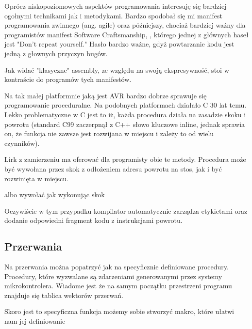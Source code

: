 \documentclass[11pt]{article}
\begin{document}
Oprócz niskopoziomowych aspektów programowania interesuję się bardziej ogołnymi technikami jak i metodykami. Bardzo spodobał się mi manifest programowania zwinnego (ang. agile) oraz późniejszy, chociaż bardziej ważny dla programistów manifest Software Craftsmanship, , którego jednej z głównych haseł jest "Don't repeat yourself." Hasło bardzo ważne, gdyż powtarzanie kodu jest jedną z głownych przyczyn bugów. 

Jak widać "klasyczne" assembly, ze względu na swoją ekspresywność, stoi w kontraście do programów tych manifestów. 

Na tak małej platformnie jaką jest AVR bardzo dobrze sprawuje się programowanie proceduralne. Na podobnych platformach działało C 30 lat temu. Lekko problematyczne w C jest to iż, każda procedura działa na zasadzie skoku i powrotu (standard C99 zaczerpnął z C++ słowo kluczowe inline, jednak sprawia on, że funkcja nie zawsze jest rozwijana w miejscu i zależy to od wielu czynników). 

Lirk z zamierzeniu ma oferować dla programisty obie te metody. Procedura może być wywołana przez skok z odłożeniem adresu powrotu na stos, jak i być rozwinięta w miejscu.
\newpage

\begin{multicols}{2}

\columnbreak

\end{multicols}
albo wywołać jak wykonując skok
\begin{multicols}{2}

\columnbreak

\end{multicols}

Oczywiście w tym przypadku kompilator automatycznie zarządza etykietami oraz dodanie odpowiedni fragment kodu z instrukcjami powrotu.

\subsection{Przerwania}

Na przerwania można popatrzyć jak na specyficznie definiowane procedury. Procedury, które wyzwalane są zdarzeniami generowanymi przez systemy mikrokontrolera.
Wiadome jest że na samym początku przestrzeni programu znajduje się tablica wektorów przerwań.

Skoro jest to specyficzna funkcja możemy sobie stworzyć makro, które ułatwi nam jej definiowanie


\end{document}
